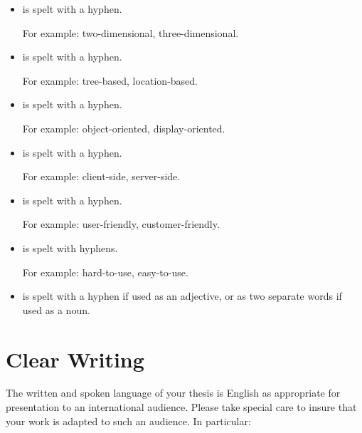 \begin{itemize}
\item {} is spelt with a hyphen.

For example: two-dimensional, three-dimensional.



\item {} is spelt with a hyphen.

For example: tree-based, location-based.



\item {} is spelt with a hyphen.

For example: object-oriented, display-oriented.


\item {} is spelt with a hyphen.

For example: client-side, server-side.


\item {} is spelt with a hyphen.

For example: user-friendly, customer-friendly.


\item {} is spelt with hyphens.

For example: hard-to-use, easy-to-use.



\item {} is spelt with a hyphen if used as
  an adjective, or as two separate words if used as a noun.



\end{itemize}












\section{Clear Writing}
\label{sec:Clear}

The written and spoken language of your thesis is English as
appropriate for presentation to an international audience. Please take
special care to insure that your work is adapted to such an audience.
In particular:

